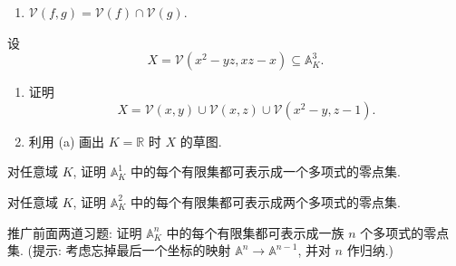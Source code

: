 \begin{BookExercises}
\begin{enumerate}[label=(\alph*)]
      \item $\mathcal{V}(f,g)=\mathcal{V}(f)\cap\mathcal{V}(g)$.
    \end{enumerate}
  \item\label{ex:decompose-a-space-vanishing-set} 设
    \[
      X=\mathcal{V}(x^{2}-yz,xz-x)\subseteq\mathbb{A}^{3}_{K}.
    \]
    \begin{enumerate}[label=(\alph*)]
      \item 证明
        \[
          X=\mathcal{V}(x,y)\cup\mathcal{V}(x,z)\cup\mathcal{V}(x^{2}-y,z-1).
        \]
      \item 利用 (a) 画出 $K=\mathbb{R}$ 时 $X$ 的草图.
    \end{enumerate}
  \item\label{ex:finite-set-affine-line} 对任意域 $K$, 证明 $\mathbb{A}^{1}_{K}$ 中的每个有限集都可表示成一个多项式的零点集.
  \item\label{ex:finite-set-affine-plane} 对任意域 $K$, 证明 $\mathbb{A}^{2}_{K}$ 中的每个有限集都可表示成两个多项式的零点集.
  \item\label{ex:finite-set-affine-space} 推广前面两道习题: 证明 $\mathbb{A}^{n}_{K}$ 中的每个有限集都可表示成一族 $n$ 个多项式的零点集. (提示: 考虑忘掉最后一个坐标的映射 $\mathbb{A}^{n}\to\mathbb{A}^{n-1}$, 并对 $n$ 作归纳.)
\end{BookExercises}
